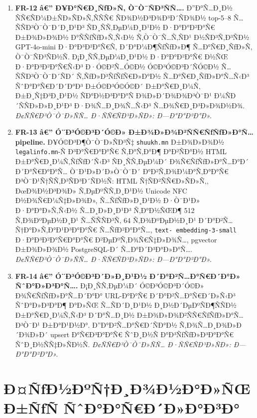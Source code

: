 \documentclass[12pt,A4]{report}
\begin{document}
\begin{enumerate}
  \item \textbf{FR-12 â€” Ð¥Ð°Ñ€Ð¸ÑƒÐ»Ñ‚ Ò¯Ò¯ÑÐ³ÑÑ….}
        Ð”Ð°Ñ…Ð¸Ð½ ÑÑ€ÑÐ¼Ð±ÑÐ»ÑÐ»Ñ‚ÑÑÑ€ ÑÐ¾Ð½Ð³Ð¾Ð³Ð´ÑÐ¾Ð½ top-5--8
        Ñ…ÑÑÐ³Ò¯Ò¯Ð´Ð¸Ð¹Ð³ ÑÐ¸ÑÑ‚ÐµÐ¼Ð¸Ð¹Ð½ Ð·Ð°Ð°Ð²Ð°Ñ€ Ð±Ð¾Ð»Ð¾Ð½ Ð°ÑÑƒÑƒÐ»Ñ‚Ñ‹Ð½
        Ñ‚Ò¯Ò¯Ñ…Ñ‚ÑÐ¹ Ð½ÑÐ³Ñ‚Ð³ÑÐ½ GPT-4o-mini Ð·Ð°Ð³Ð²Ð°Ñ€Ñ‚ Ð´Ð°Ð¼Ð¶ÑƒÑƒÐ»Ð¶
        Ñ…Ð°Ñ€Ð¸ÑƒÐ»Ñ‚ Ò¯Ò¯ÑÐ³ÑÐ½Ñ. Ð¡Ð¸ÑÑ‚ÐµÐ¼Ð¸Ð¹Ð½ Ð·Ð°Ð°Ð²Ð°Ñ€ Ð½ÑŒ Ð·Ð°Ð³Ð²Ð°Ñ€Ñ‹Ð³
        Ð·Ó©Ð²Ñ…Ó©Ð½ Ó©Ð³Ó©Ð³Ð´ÑÓ©Ð½ Ñ…ÑÑÐ³Ò¯Ò¯Ð´ÑÐ´ Ñ‚ÑƒÐ»Ð³ÑƒÑƒÑ€Ð»Ð°Ð½ Ñ…Ð°Ñ€Ð¸ÑƒÐ»Ð°Ñ…Ñ‹Ð³
        ÑˆÐ°Ð°Ñ€Ð´Ð´Ð°Ð³ Ð±Ó©Ð³Ó©Ó©Ð´ Ð±Ð°Ñ€Ð¸Ð¼Ñ‚ Ð±Ð¸Ñ‡Ð³Ð¸Ð¹Ð½ ÑÐ°Ð½Ð³Ð°Ð°Ñ Ð¾Ð»Ð´Ð¾Ð¾Ð³Ò¯Ð¹
        Ð¼ÑÐ´ÑÑÐ»Ð»Ð¸Ð¹Ð³ Ð·Ð¾Ñ…Ð¸Ð¾Ñ…Ñ‹Ð³ Ñ…Ð¾Ñ€Ð¸Ð³Ð»Ð¾Ð½Ð¾.
        \textit{Ð¢ÑÑ€Ð³Ò¯Ò¯Ð»ÑÑ… Ð·ÑÑ€ÑÐ³Ð»ÑÐ»: Ð—Ð°Ð°Ð²Ð°Ð».}

  \item \textbf{FR-13 â€” Ó¨Ð³Ó©Ð³Ð´Ó©Ð» Ð±Ð¾Ð»Ð¾Ð²ÑÑ€ÑƒÑƒÐ»Ð°Ñ… pipeline.}
        Ð¥Ó©Ð³Ð¶Ò¯Ò¯Ð»ÑÐ³Ñ‡ \texttt{shuukh.mn} Ð±Ð¾Ð»Ð¾Ð½
        \texttt{legalinfo.mn}-Ñ Ð³Ð°Ñ€Ð°Ð°Ñ€ Ñ‚Ð°Ñ‚Ð°Ð¶ Ð°Ð²ÑÐ°Ð½
        HTML Ð±Ð°Ñ€Ð¸Ð¼Ñ‚ÑƒÑƒÐ´Ñ‹Ð³ ÑÐ¸ÑÑ‚ÐµÐ¼Ð´ Ð¾Ñ€ÑƒÑƒÐ»Ð°Ñ…Ð°Ð´ Ð´Ð°Ñ€Ð°Ð°Ñ…
        Ò¯Ð¹Ð»Ð´Ð»Ò¯Ò¯Ð´ Ð°Ð²Ñ‚Ð¾Ð¼Ð°Ñ‚Ð°Ð°Ñ€ Ð³Ò¯Ð¹Ñ†ÑÑ‚Ð³ÑÐ³Ð´ÑÐ½Ñ: HTML
        Ñ†ÑÐ²ÑÑ€Ð»ÑÐ»Ñ‚, ÐœÐ¾Ð½Ð³Ð¾Ð» Ñ‚ÐµÐºÑÑ‚Ð¸Ð¹Ð½ Unicode NFC
        Ð½Ð¾Ñ€Ð¼Ñ‡Ð»Ð¾Ð», Ñ…ÑƒÑƒÐ»Ð¸Ð¹Ð½ Ð·Ò¯Ð¹Ð» Ð·Ð°Ð°Ð»Ñ‚Ñ‹Ð½ Ñ…Ð¸Ð»Ð¸Ð¹Ð³ Ñ‚Ð°Ð½ÑŒÐ¶
        512 Ñ‚Ð¾ÐºÐµÐ½Ð¸Ð¹ Ñ…ÑÑÑÐ³Ñ‚ 64 Ñ‚Ð¾ÐºÐµÐ½Ð¸Ð¹ Ð´Ð°Ð²Ñ…Ñ†Ð°Ð»Ñ‚Ð°Ð¹Ð³Ð°Ð°Ñ€
        Ñ…ÑƒÐ²Ð°Ð°Ñ…, \texttt{text- embedding-3-small}
        Ð·Ð°Ð³Ð²Ð°Ñ€Ð°Ð°Ñ€ Ð²ÐµÐºÑ‚Ð¾Ñ€Ñ‡Ð»Ð¾Ñ…, pgvector Ð±Ð¾Ð»Ð¾Ð½ PostgreSQL-Ð´
        Ñ…Ð°Ð´Ð³Ð°Ð»Ð°Ñ….
        \textit{Ð¢ÑÑ€Ð³Ò¯Ò¯Ð»ÑÑ… Ð·ÑÑ€ÑÐ³Ð»ÑÐ»: Ð—Ð°Ð°Ð²Ð°Ð».}

  \item \textbf{FR-14 â€” Ó¨Ð³Ó©Ð³Ð´Ð»Ð¸Ð¹Ð½ Ð´Ð°Ð²Ñ…Ð°Ñ€Ð´Ð°Ð» ÑˆÐ°Ð»Ð³Ð°Ñ….}
        Ð¡Ð¸ÑÑ‚ÐµÐ¼Ð´ Ó©Ð³Ó©Ð³Ð´Ó©Ð» Ð¾Ñ€ÑƒÑƒÐ»Ð°Ñ…Ð´Ð°Ð° URL-Ð°Ð°Ñ€ Ð´Ð°Ð²Ñ…Ð°Ñ€Ð´Ð»Ñ‹Ð³
        ÑˆÐ°Ð»Ð³Ð°Ð¶ Ð°Ð»ÑŒ Ñ…ÑÐ´Ð¸Ð¹Ð½ Ð¸Ð½Ð´ÐµÐºÑÐ¶ÑÑÐ½ Ð±Ð°Ñ€Ð¸Ð¼Ñ‚Ñ‹Ð³ Ð´Ð°Ñ…Ð¸Ð½
        Ð±Ð¾Ð»Ð¾Ð²ÑÑ€ÑƒÑƒÐ»Ð°Ñ…Ð³Ò¯Ð¹ Ð±Ð°Ð¹Ð½Ð°. Ð”Ð°Ð²Ñ…Ð°Ñ€Ð´ÑÐ°Ð½ Ñ‚Ð¾Ñ…Ð¸Ð¾Ð»Ð´Ð¾Ð»Ð´
        upsert Ð°Ñ€Ð³Ð°Ð°Ñ€ ÑˆÐ¸Ð½Ñ Ð°Ð³ÑƒÑƒÐ»Ð³Ð°Ð°Ñ€ ÑˆÐ¸Ð½ÑÑ‡Ð»ÑÐ½Ñ.
        \textit{Ð¢ÑÑ€Ð³Ò¯Ò¯Ð»ÑÑ… Ð·ÑÑ€ÑÐ³Ð»ÑÐ»: Ð—Ð°Ð°Ð²Ð°Ð».}

\end{enumerate}

\section{Ð¤ÑƒÐ½ÐºÑ†Ð¸Ð¾Ð½Ð°Ð»ÑŒ Ð±ÑƒÑ ÑˆÐ°Ð°Ñ€Ð´Ð»Ð°Ð³Ð°}
\end{document}
